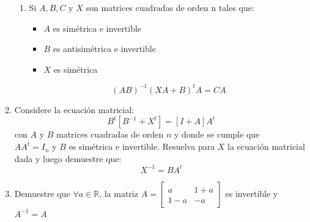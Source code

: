 \documentclass[12pt]{article}
\begin{document}
\begin{enumerate}
\begin{enumerate}
              \item Si $A, B, C$ y $X$ son matrices cuadradas de orden n tales que:
                    \begin{itemize}
                        \item $A$ es sim\'etrica e invertible
                        \item $B$ es antisim\'etrica e invertible
                        \item $X$ es sim\'etrica
                    \end{itemize}
                    $$(AB)^{-1}(XA+B)^tA=CA$$
          \end{enumerate}
    \item Considere la ecuaci\'on matricial:
          $$B^t[B^{-1}+X^t]=[I+A]A^t$$
          con $A$ y $B$ matrices cuadradas de orden $n$
          y donde se cumple que $AA^t=I_n\mbox{ y }B$ es
          sim\'etrica e invertible. Resuelva para $X$ la ecuaci\'on
          matricial dada y luego demuestre que:
          $$X^{-1}=BA^t$$
          
          
          
          
          
    \item Demuestre que $\forall a \in \mathbb{R}$,
          la matriz $A=\begin{bmatrix}
                  a     & {1+a} \\
                  {1-a} & -a
              \end{bmatrix}$ es invertible y $A^{-1}=A$
          

\end{enumerate}
\end{document}
